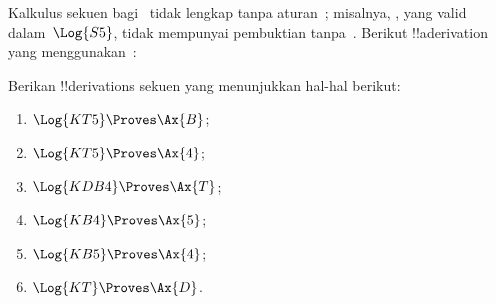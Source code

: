 \documentclass[../../../include/open-logic-section]{subfiles}
\begin{document}
\begin{ex}
Kalkulus sekuen bagi~ tidak lengkap tanpa aturan~\Cut{}; misalnya,
, yang
valid dalam~$\Log{S5}$, tidak mempunyai pembuktian tanpa~\Cut. Berikut
!!a{derivation} yang menggunakan~\Cut:
\begin{prooftree}
\end{prooftree}
\end{ex}

\begin{prob}
Berikan !!{derivation}s sekuen yang menunjukkan hal-hal berikut:
  \begin{enumerate}
  \item $\Log{KT5} \Proves \Ax{B}$;
  \item $\Log{KT5} \Proves \Ax{4}$;
  \item $\Log{KDB4} \Proves \Ax{T}$;
  \item $\Log{KB4} \Proves \Ax{5}$;
  \item $\Log{KB5} \Proves \Ax{4}$;
  \item $\Log{KT} \Proves \Ax{D}$.
  \end{enumerate}
\end{prob}
\end{document}
